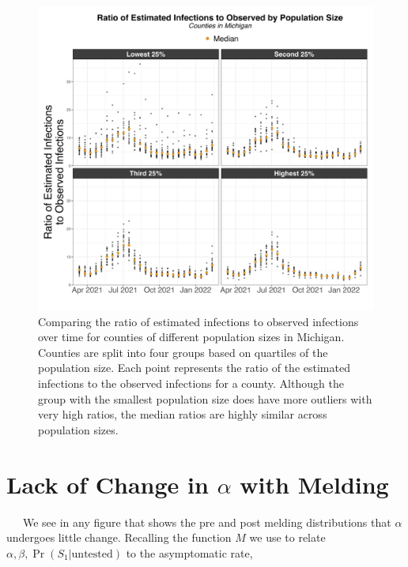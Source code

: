 \documentclass[12pt,twoside]{smiththesis}
\begin{document}
\begin{figure}

{\centering \includegraphics[width=1\linewidth]{figure/mi-ratio-pop} 

}

\caption{\label{fig:mi-ratio-pop}Comparing the ratio of estimated infections to observed infections over time for counties of different population sizes in Michigan. Counties are split into four groups based on quartiles of the population size. Each point represents the ratio of the estimated infections to the observed infections for a county. Although the group with the smallest population size does have more outliers with very high ratios, the median ratios are highly similar across population sizes.}\label{fig:unnamed-chunk-118}
\end{figure}
\newpage

\hypertarget{alpha-melding}{%
\section{\texorpdfstring{Lack of Change in \(\alpha\) with Melding}{Lack of Change in \textbackslash alpha with Melding}}\label{alpha-melding}}

~~~We see in any figure that shows the pre and post melding distributions that \(\alpha\) undergoes little change. Recalling the function \(M\) we use to relate \(\alpha,\beta,\Pr(S_1|\text{untested})\) to the asymptomatic rate,
\end{document}
